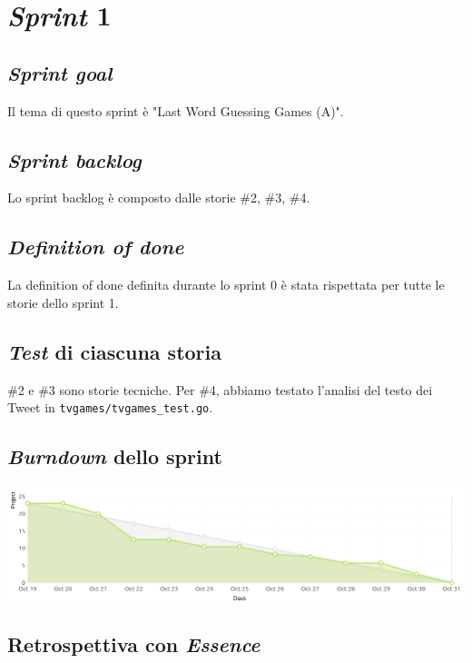 \documentclass{article}
\begin{document}
\section{\emph{Sprint} 1}

\subsection{\emph{Sprint goal}}

Il tema di questo sprint è "Last Word Guessing Games (A)".

\subsection{\emph{Sprint backlog}}

Lo sprint backlog è composto dalle storie \#2, \#3, \#4.

\subsection{\emph{Definition of done}}

La definition of done definita durante lo sprint 0 è stata rispettata per tutte
le storie dello sprint 1.

\subsection{\emph{Test} di ciascuna storia}

\#2 e \#3 sono storie tecniche. Per \#4, abbiamo testato l'analisi del testo dei
Tweet in \verb!tvgames/tvgames_test.go!.

\subsection{\emph{Burndown} dello sprint}

\includegraphics[width=\textwidth]{burndown-1.png}

\subsection{Retrospettiva con \emph{Essence}}
\end{document}
